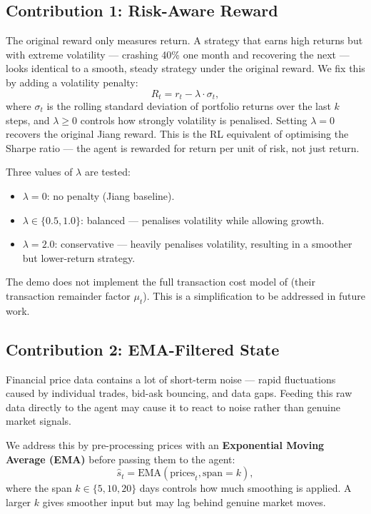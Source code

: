 \documentclass[12pt,a4paper]{article}
\begin{document}
\subsection{Contribution 1: Risk-Aware Reward}

The original reward only measures return. A strategy that earns high
returns but with extreme volatility --- crashing 40\% one month and
recovering the next --- looks identical to a smooth, steady strategy
under the original reward. We fix this by adding a volatility penalty:
\begin{equation}
  R_t = r_t - \lambda \cdot \sigma_t,
  \label{eq:riskreward}
\end{equation}
where $\sigma_t$ is the rolling standard deviation of portfolio returns
over the last $k$ steps, and $\lambda \geq 0$ controls how strongly
volatility is penalised. Setting $\lambda = 0$ recovers the original
Jiang reward. This is the RL equivalent of optimising the Sharpe ratio
--- the agent is rewarded for return per unit of risk, not just return.

Three values of $\lambda$ are tested:
\begin{itemize}[nosep]
  \item $\lambda = 0$: no penalty (Jiang baseline).
  \item $\lambda \in \{0.5, 1.0\}$: balanced --- penalises volatility
        while allowing growth.
  \item $\lambda = 2.0$: conservative --- heavily penalises volatility,
        resulting in a smoother but lower-return strategy.
\end{itemize}

\begin{tcolorbox}[limitstyle]
The demo does not implement the full transaction cost model of
\citet{jiang2017deep} (their transaction remainder factor $\mu_t$).
This is a simplification to be addressed in future work.
\end{tcolorbox}

\subsection{Contribution 2: EMA-Filtered State}

Financial price data contains a lot of short-term noise --- rapid
fluctuations caused by individual trades, bid-ask bouncing, and data
gaps. Feeding this raw data directly to the agent may cause it to
react to noise rather than genuine market signals.

We address this by pre-processing prices with an
\textbf{Exponential Moving Average (EMA)} before passing them to the
agent:
\begin{equation}
  \hat{s}_t = \text{EMA}(\text{prices}_t, \text{span}=k),
\end{equation}
where the span $k \in \{5, 10, 20\}$ days controls how much smoothing
is applied. A larger $k$ gives smoother input but may lag behind
genuine market moves.
\end{document}

